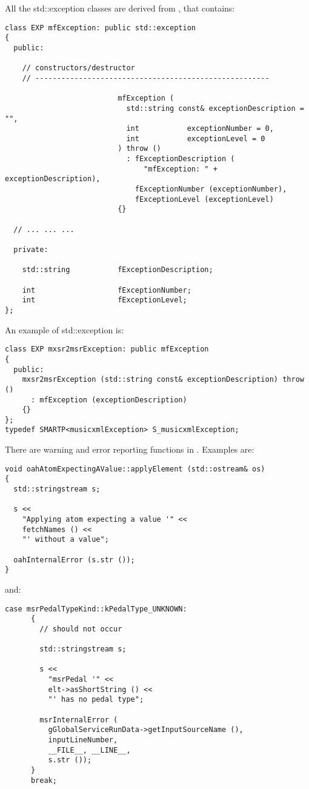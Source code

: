 All the std::exception classes are derived from {\tt }, that contains:
\begin{lstlisting}[language=CPlusPlus]
class EXP mfException: public std::exception
{
  public:

    // constructors/destructor
    // ------------------------------------------------------

                          mfException (
                            std::string const& exceptionDescription = "",
                            int           exceptionNumber = 0,
                            int           exceptionLevel = 0
                          ) throw ()
                            : fExceptionDescription (
                                "mfException: " + exceptionDescription),
                              fExceptionNumber (exceptionNumber),
                              fExceptionLevel (exceptionLevel)
                          {}

  // ... ... ...

  private:

    std::string           fExceptionDescription;

    int                   fExceptionNumber;
    int                   fExceptionLevel;
};
\end{lstlisting}

An example of std::exception is:
\begin{lstlisting}[language=CPlusPlus]
class EXP mxsr2msrException: public mfException
{
  public:
    mxsr2msrException (std::string const& exceptionDescription) throw ()
      : mfException (exceptionDescription)
    {}
};
typedef SMARTP<musicxmlException> S_musicxmlException;
\end{lstlisting}

There are warning and error reporting functions in .
Examples are:
\begin{lstlisting}[language=CPlusPlus]
void oahAtomExpectingAValue::applyElement (std::ostream& os)
{
  std::stringstream s;

  s <<
    "Applying atom expecting a value '" <<
    fetchNames () <<
    "' without a value";

  oahInternalError (s.str ());
}
\end{lstlisting}

and:
\begin{lstlisting}[language=CPlusPlus]
    case msrPedalTypeKind::kPedalType_UNKNOWN:
      {
        // should not occur

        std::stringstream s;

        s <<
          "msrPedal '" <<
          elt->asShortString () <<
          "' has no pedal type";

        msrInternalError (
          gGlobalServiceRunData->getInputSourceName (),
          inputLineNumber,
          __FILE__, __LINE__,
          s.str ());
      }
      break;
\end{lstlisting}

